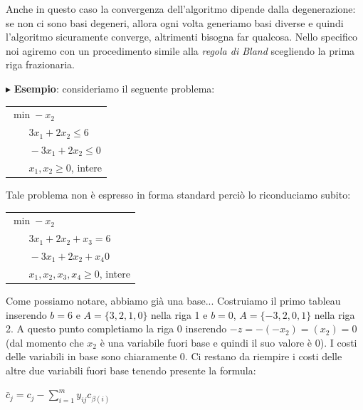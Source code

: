 \documentclass[11pt]{book}
\begin{document}
Anche in questo caso la convergenza dell'algoritmo dipende dalla
degenerazione: se non ci sono basi degeneri, allora ogni volta
generiamo basi diverse e quindi l'algoritmo sicuramente converge,
altrimenti bisogna far qualcosa. Nello specifico noi agiremo con un
procedimento simile alla {\em regola di Bland} scegliendo la prima
riga frazionaria.

\vspace{11pt}
$\blacktriangleright$ {\bf Esempio}: consideriamo il seguente
problema:

\vspace{11pt}
\begin{center}
  \begin{tabular}{l}
    $\min -x_2$\\
    $\phantom{min}3x_1 + 2x_2 \leq 6$\\
    $\phantom{min}-3x_1 + 2x_2 \leq 0$\\
    $\phantom{min}x_1, x_2 \geq 0$, intere\\
  \end{tabular}
\end{center}
\vspace{11pt}

Tale problema non \`e espresso in forma standard perci\`o lo
riconduciamo subito:

\vspace{11pt}
\begin{center}
  \begin{tabular}{l}
    $\min -x_2$\\
    $\phantom{min}3x_1 + 2x_2 + x_3 = 6$\\
    $\phantom{min}-3x_1 + 2x_2 + x_4 0$\\
    $\phantom{min}x_1, x_2, x_3, x_4 \geq 0$, intere\\
  \end{tabular}
\end{center}
\vspace{11pt}

Come possiamo notare, abbiamo gi\`a una base... Costruiamo il primo
tableau inserendo $b=6$ e $A=\{3, 2, 1, 0 \}$ nella riga 1 e $b=0$, $A
= \{ -3, 2, 0, 1\}$ nella riga 2. A questo punto completiamo la riga 0
inserendo $-z = -(-x_2) = (x_2) = 0$ (dal momento che $x_2$ \`e una
variabile fuori base e quindi il suo valore \`e 0). I costi delle
variabili in base sono chiaramente 0. Ci restano da riempire i costi
delle altre due variabili fuori base tenendo presente la formula:

\begin{center}
$\bar{c}_j = c_j - \sum\limits_{i=1}^m y_{ij}c_{\beta(i)}$
\end{center}
\end{document}
